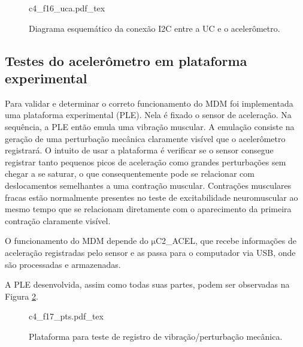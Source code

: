 \begin{figure}
    \centering %
    \small %
    \def\svgwidth{0.9\columnwidth}%
    {c4_f16_uca.pdf_tex}
    \caption{Diagrama esquemático da conexão \acrshort{I2C} entre a \acrshort{UC} e o acelerômetro.}
    \label{fig:c4_f16_uca}
\end{figure}


\subsection*{Testes do acelerômetro em plataforma experimental}

Para validar e determinar o correto funcionamento do \acrshort{MDM} foi implementada uma plataforma experimental (\acrshort{PLE}). Nela é fixado o sensor de aceleração. Na sequência, a \acrshort{PLE} então emula uma vibração muscular. A emulação consiste na geração de uma perturbação mecânica claramente visível que o acelerômetro registrará. O intuito de usar a plataforma é verificar se o sensor consegue registrar tanto pequenos picos de aceleração como grandes perturbações sem chegar a se saturar, o que consequentemente pode se relacionar com deslocamentos semelhantes a uma contração muscular. Contrações musculares fracas estão normalmente presentes no teste de excitabilidade neuromuscular ao mesmo tempo que se relacionam diretamente com o aparecimento da primeira contração claramente visível.

O funcionamento do \acrshort{MDM} depende do $\mathrm{\mu}$C2\_ACEL, que recebe informações de aceleração registradas pelo sensor e as passa para o computador via \acrshort{USB}, onde são processadas e armazenadas.

A \acrshort{PLE} desenvolvida, assim como todas suas partes, podem ser observadas na Figura \ref{fig:c4_f17_pts}.


\begin{figure}[h]
    \centering %
    \normalsize %
    \def\svgwidth{1\columnwidth}%
    {c4_f17_pts.pdf_tex}
    \caption{Plataforma para teste de registro de vibração/perturbação mecânica.}
    \label{fig:c4_f17_pts}
\end{figure}

